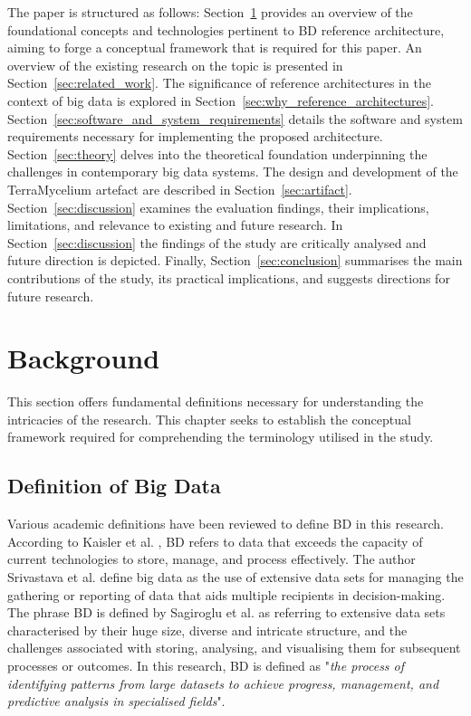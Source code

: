 \documentclass[journal]{IEEEtran}
\begin{document}
The paper is structured as follows: Section~\ref{sec:background} provides an overview of the foundational concepts and technologies pertinent to BD reference architecture, aiming to forge a conceptual framework that is required for this paper. An overview of the existing research on the topic is presented in Section~\ref{sec:related_work}. The significance of reference architectures in the context of big data is explored in Section~\ref{sec:why_reference_architectures}. Section~\ref{sec:software_and_system_requirements} details the software and system requirements necessary for implementing the proposed architecture. Section~\ref{sec:theory} delves into the theoretical foundation underpinning the challenges in contemporary big data systems. The design and development of the TerraMycelium artefact are described in Section~\ref{sec:artifact}. Section~\ref{sec:discussion} examines the evaluation findings, their implications, limitations, and relevance to existing and future research. In Section~\ref{sec:discussion} the findings of the study are critically analysed and future direction is depicted. Finally, Section~\ref{sec:conclusion} summarises the main contributions of the study, its practical implications, and suggests directions for future research.

\section{Background} \label{sec:background} 

This section offers fundamental definitions necessary for understanding the intricacies of the research. This chapter seeks to establish the conceptual framework required for comprehending the terminology utilised in the study. 

\subsection{Definition of Big Data} Various academic definitions have been reviewed to define BD in this research. According to Kaisler et al. \cite{Kaisler2013}, BD refers to data that exceeds the capacity of current technologies to store, manage, and process effectively. The author Srivastava et al. \cite{Srivastava2016} define big data as the use of extensive data sets for managing the gathering or reporting of data that aids multiple recipients in decision-making. The phrase BD is defined by Sagiroglu et al. \cite{Sagiroglu2013} as referring to extensive data sets characterised by their huge size, diverse and intricate structure, and the challenges associated with storing, analysing, and visualising them for subsequent processes or outcomes. In this research, BD is defined as "\emph{the process of identifying patterns from large datasets to achieve progress, management, and predictive analysis in specialised fields}". 
\end{document}
